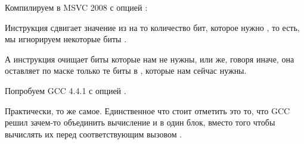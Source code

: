 
Компилируем в MSVC 2008 с опцией \Ox:



Инструкция  сдвигает значение из \EAX на то количество бит, 
которое нужно , то есть, мы игнорируем некоторые биты .

А инструкция \AND очищает биты  которые нам не нужны, или же, говоря иначе, 
она оставляет по маске только те биты в \EAX, которые нам сейчас нужны.




Попробуем GCC 4.4.1 с опцией \Othree.



Практически, то же самое. Единственное что стоит отметить это то, что GCC решил зачем-то объединить 
вычисление  и  в один блок, 
вместо того чтобы вычислять их перед соответствующим вызовом \printf.


